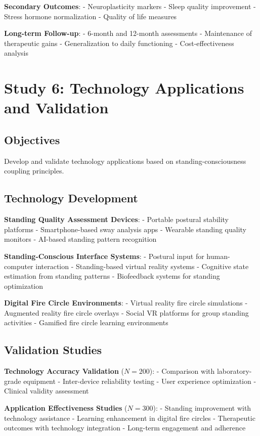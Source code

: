 \documentclass[12pt]{article}
\begin{document}
\textbf{Secondary Outcomes}:
- Neuroplasticity markers
- Sleep quality improvement
- Stress hormone normalization
- Quality of life measures

\textbf{Long-term Follow-up}:
- 6-month and 12-month assessments
- Maintenance of therapeutic gains
- Generalization to daily functioning
- Cost-effectiveness analysis

\section{Study 6: Technology Applications and Validation}

\subsection{Objectives}

Develop and validate technology applications based on standing-consciousness coupling principles.

\subsection{Technology Development}

\textbf{Standing Quality Assessment Devices}:
- Portable postural stability platforms
- Smartphone-based sway analysis apps
- Wearable standing quality monitors
- AI-based standing pattern recognition

\textbf{Standing-Conscious Interface Systems}:
- Postural input for human-computer interaction
- Standing-based virtual reality systems
- Cognitive state estimation from standing patterns
- Biofeedback systems for standing optimization

\textbf{Digital Fire Circle Environments}:
- Virtual reality fire circle simulations
- Augmented reality fire circle overlays
- Social VR platforms for group standing activities
- Gamified fire circle learning environments

\subsection{Validation Studies}

\textbf{Technology Accuracy Validation} ($N = 200$):
- Comparison with laboratory-grade equipment
- Inter-device reliability testing
- User experience optimization
- Clinical validity assessment

\textbf{Application Effectiveness Studies} ($N = 300$):
- Standing improvement with technology assistance
- Learning enhancement in digital fire circles
- Therapeutic outcomes with technology integration
- Long-term engagement and adherence
\end{document}
